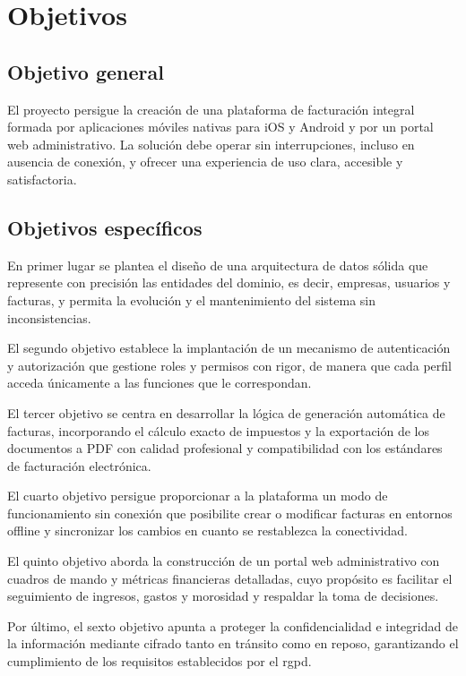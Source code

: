 \section{Objetivos}
\begin{large}

\subsection{Objetivo general}
El proyecto persigue la creación de una plataforma de facturación integral formada por aplicaciones móviles nativas para iOS y Android y por un portal web administrativo. La solución debe operar sin interrupciones, incluso en ausencia de conexión, y ofrecer una experiencia de uso clara, accesible y satisfactoria.

\subsection{Objetivos específicos}
En primer lugar se plantea el diseño de una arquitectura de datos sólida que represente con precisión las entidades del dominio, es decir, empresas, usuarios y facturas, y permita la evolución y el mantenimiento del sistema sin inconsistencias.

El segundo objetivo establece la implantación de un mecanismo de autenticación y autorización que gestione roles y permisos con rigor, de manera que cada perfil acceda únicamente a las funciones que le correspondan.

El tercer objetivo se centra en desarrollar la lógica de generación automática de facturas, incorporando el cálculo exacto de impuestos y la exportación de los documentos a PDF con calidad profesional y compatibilidad con los estándares de facturación electrónica.

El cuarto objetivo persigue proporcionar a la plataforma un modo de funcionamiento sin conexión que posibilite crear o modificar facturas en entornos offline y sincronizar los cambios en cuanto se restablezca la conectividad.

\pagebreak

El quinto objetivo aborda la construcción de un portal web administrativo con cuadros de mando y métricas financieras detalladas, cuyo propósito es facilitar el seguimiento de ingresos, gastos y morosidad y respaldar la toma de decisiones.

Por último, el sexto objetivo apunta a proteger la confidencialidad e integridad de la información mediante cifrado tanto en tránsito como en reposo, garantizando el cumplimiento de los requisitos establecidos por el \gls{rgpd}.
\end{large}

